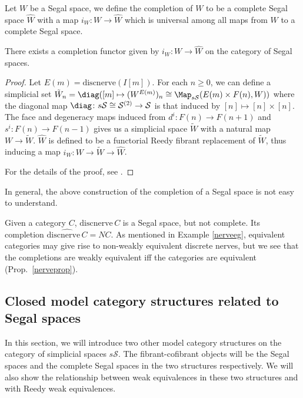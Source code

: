 \begin{defin}
Let $W$ be a Segal space, we define the completion of $W$ to be a complete Segal space $\hat W$ with a map $i_W:W\to\hat W$ which is universal among all maps from $W$ to a complete Segal space.
\end{defin}

\begin{prop}
There exists a completion functor given by $i_W:W\to\hat W$ on the category of Segal spaces.
\end{prop}
\begin{proof}
Let $E(m)=\mathrm{discnerve}(I[m])$. For each $n \ge 0$, we can define a simplicial set $\tilde W_n=\diag([m]\mapsto (W^{E(m)})_n \cong \Map_{s\mathcal S}(E(m)\times F(n),W))$ where the diagonal map $\diag \colon s\mathcal S\cong\mathcal S^{(2)}\to\mathcal S$ is that induced by $[n]\mapsto[n]\times[n]$. The face and degeneracy maps induced from $d^i \colon F(n)\to F(n+1)$ and $s^i \colon F(n)\to F(n-1)$ gives us a simplicial space $\tilde W$ with a natural map $W\to \tilde W$. $\hat W$ is defined to be a functorial Reedy fibrant replacement of $\tilde W$, thus inducing a map $i_W:W\to\tilde W\to\hat W$.

For the details of the proof, see \cite{rezk}.
\end{proof}

In general, the above construction of the completion of a Segal space is not easy to understand.

\begin{eg}\label{nervecomplete}
Given a category $C$, $\mathrm{discnerve}\,C$ is a Segal space, but not complete. Its completion $\widehat{\mathrm{discnerve}\,C}=NC$. As mentioned in Example \ref{nerveeg}, equivalent categories may give rise to non-weakly equivalent discrete nerves, but we see that the completions are weakly equivalent iff the categories are equivalent (Prop.~\ref{nerveprop}).
\end{eg}

\subsection{Closed model category structures related to Segal spaces}
In this section, we will introduce two other model category structures on the category of simplicial spaces $s\mathcal S$. The fibrant-cofibrant objects will be the Segal spaces and the complete Segal spaces in the two structures respectively. We will also show the relationship between weak equivalences in these two structures and with Reedy weak equivalences.

